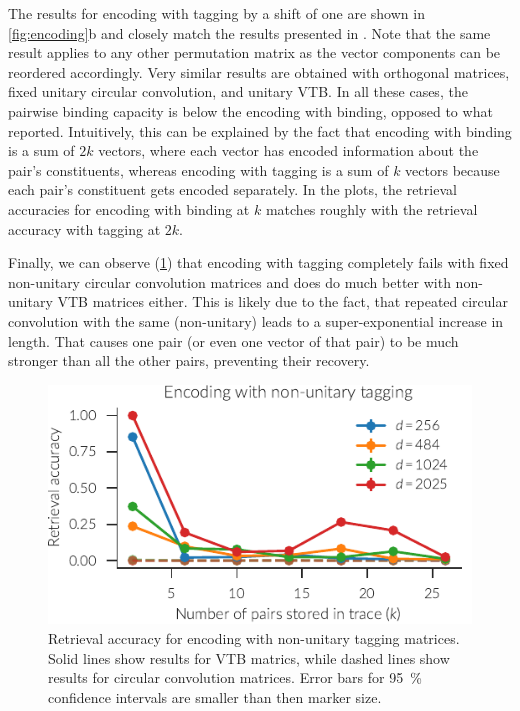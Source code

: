 The results for encoding with tagging by a shift of one are shown in \cref{fig:encoding}b and closely match the results presented in \textcite{recchia2015}.
Note that the same result applies to any other permutation matrix as the vector components can be reordered accordingly.
Very similar results are obtained with orthogonal matrices, fixed unitary circular convolution, and unitary VTB\@.
In all these cases, the pairwise binding capacity is below the encoding with binding, opposed to what \textcite{recchia2015} reported.
Intuitively, this can be explained by the fact that encoding with binding is a sum of $2k$ vectors, where each vector has encoded information about the pair's constituents, whereas encoding with tagging is a sum of $k$ vectors because each pair's constituent gets encoded separately.
In the plots, the retrieval accuracies for encoding with binding at $k$ matches roughly with the retrieval accuracy with tagging at $2k$.

Finally, we can observe (\cref{fig:encoding-nonunitary-tagging}) that encoding with tagging completely fails with fixed non-unitary circular convolution matrices and does do much better with non-unitary VTB matrices either.
This is likely due to the fact, that repeated circular convolution with the same (non-unitary) leads to a super-exponential increase in length.
That causes one pair (or even one vector of that pair) to be much stronger than all the other pairs, preventing their recovery.
\begin{figure}
    \centering
    \includegraphics{figures/encoding-nonunitary-tagging}
    \caption[Retrieval accuracy of encoding with non-unitary tagging matrices]{Retrieval accuracy for encoding with non-unitary tagging matrices. Solid lines show results for VTB matrics, while dashed lines show results for circular convolution matrices. Error bars for \SI{95}{\percent} confidence intervals are smaller than then marker size.}\label{fig:encoding-nonunitary-tagging}
\end{figure}

